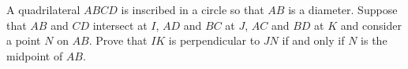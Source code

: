 \documentclass[varwidth]{standalone}
\begin{document}
    A quadrilateral $ABCD$ is inscribed in a circle so that $AB$ is a diameter. Suppose that $AB$ and $CD$ intersect at $I$, $AD$ and $BC$ at $J$, $AC$ and $BD$ at $K$ and consider a point $N$ on $AB$. Prove that $IK$ is perpendicular to $JN$ if and only if $N$ is the midpoint of $AB$.
\end{document}
